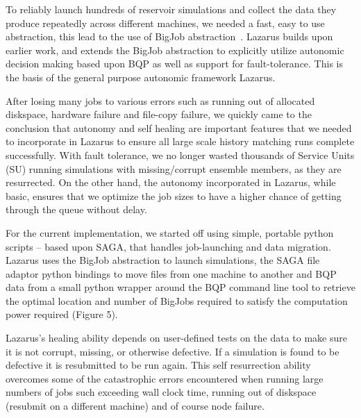\documentclass{sig-alternate}
\begin{document}

To reliably launch hundreds of reservoir simulations and collect the
data they produce repeatedly across different machines, we needed a
fast, easy to use abstraction, this lead to the use of BigJob
abstraction~\cite{saga_royalsoc}.  Lazarus builds upon earlier work,
and extends the BigJob abstraction to explicitly utilize autonomic
decision making based upon BQP as well as support for
fault-tolerance. This is the basis of the general purpose autonomic
framework Lazarus.

After losing many jobs to various errors such as running out of allocated diskspace, hardware failure and file-copy failure, we quickly came to the conclusion that autonomy and self healing are important features that we needed to incorporate in Lazarus to ensure all large scale history matching runs complete successfully. With fault tolerance, we no longer wasted thousands of Service Units (SU) running simulations with missing/corrupt ensemble members, as they are resurrected.  On the other hand, the autonomy incorporated in Lazarus, while basic, ensures that we optimize the job sizes to have a higher chance of getting through the queue without delay.

For the current implementation, we started off using simple, portable
python scripts -- based upon SAGA, that handles job-launching and data
migration. %
Lazarus uses the BigJob abstraction to launch simulations,
the SAGA file adaptor python bindings to move files from one machine
to another and BQP data from a small python wrapper around the BQP
command line tool to retrieve the optimal location and number of
BigJobs required to satisfy the computation power required (Figure 5).

Lazarus's healing ability depends on user-defined tests on the data to
make sure it is not corrupt, missing, or otherwise defective. If a
simulation is found to be defective it is resubmitted to be run
again. This self resurrection ability overcomes some of the
catastrophic errors encountered when running large numbers of jobs
such exceeding wall clock time, running out of diskspace (resubmit on
a different machine) and of course node failure.
\end{document}
